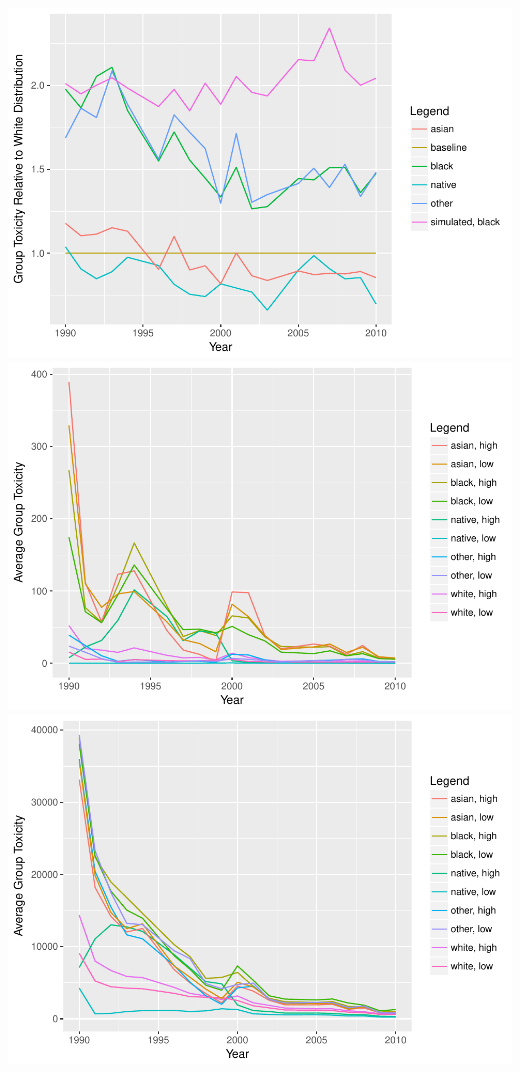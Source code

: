 \documentclass[12pt,twoside]{dukestatscithesis}
\theoremstyle{definition}
\theoremstyle{definition}
\theoremstyle{definition}
\theoremstyle{remark}
\begin{document}
\includegraphics{thesis_files/figure-latex/unnamed-chunk-4-6.pdf}
\includegraphics{thesis_files/figure-latex/unnamed-chunk-4-7.pdf}
\includegraphics{thesis_files/figure-latex/unnamed-chunk-4-8.pdf}
\end{document}
